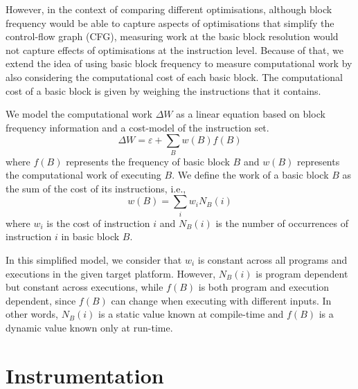 \documentclass[sigplan,9pt]{acmart}
\begin{document}
However, in the context of comparing different optimisations,
although block frequency would be able to capture aspects of optimisations
that simplify the control-flow graph (CFG), measuring work at the basic block
resolution would not capture effects of optimisations at the instruction level.
Because of that, we extend the idea of using basic block frequency to measure
computational work by also considering the computational cost of each
basic block. The computational cost of a basic block is given by weighing
the instructions that it contains.

We model the computational work $\Delta W$ as a linear equation based on
block frequency information and a cost-model of the instruction set.
\[
\Delta W = \varepsilon + \sum_{B} w(B)f(B)
\]
where $f(B)$ represents the frequency of basic block $B$
and $w(B)$ represents the computational work of executing $B$.
We define the work of a basic block $B$ as the sum of the cost
of its instructions, i.e.,
\[
w(B) = \sum_{i} w_i N_B(i)
\]
where $w_i$ is the cost of instruction $i$ and $N_B(i)$ is the number of
occurrences of instruction $i$ in basic block $B$.

In this simplified model, we consider that $w_i$ is constant across all
programs and executions in the given target platform.
However, $N_B(i)$ is program dependent but constant across executions,
while $f(B)$ is both program and execution dependent, since $f(B)$ can
change when executing with different inputs.
In other words, $N_B(i)$ is a static value known at compile-time and 
$f(B)$ is a dynamic value known only at run-time.

%

\section{Instrumentation}
\end{document}
